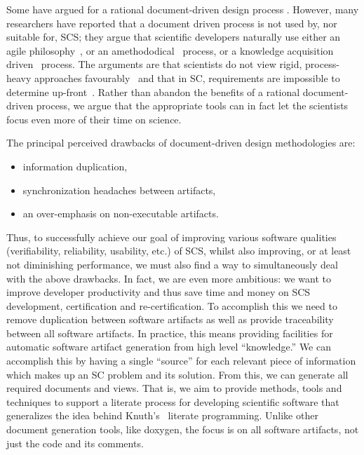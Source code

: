 \documentclass{sig-alternate-05-2015}
\begin{document}
Some have argued for a rational document-driven design process 
\cite{SmithAndKoothoor2016}.  However, many researchers have
reported that a document driven process is not used by, nor suitable for, SCS;
they argue that scientific developers naturally use either an agile
philosophy~\cite{CarverEtAl2007, EasterbrookAndJohns2009, Segal2005}, or an
amethododical~\cite{Kelly2013} process, or a knowledge acquisition
driven~\cite{Kelly2015} process.  The arguments are that scientists do not
view rigid, process-heavy approaches favourably~\cite{CarverEtAl2007} and that
in SC, requirements are impossible to determine up-front~\cite{CarverEtAl2007,
  SegalAndMorris2008}.  Rather than abandon the benefits of a rational
document-driven process, we argue that the appropriate tools can in fact
let the scientists focus even more of their time on science.

The principal perceived drawbacks of document-driven design methodologies are:
\begin{itemize}
\setlength{\itemsep}{0.0em}
\setlength{\parskip}{0pt}
\setlength{\parsep}{0pt}
\item information duplication,
\item synchronization headaches between artifacts,
\item an over-emphasis on non-executable artifacts.
\end{itemize}

Thus, to successfully achieve our goal of improving various software qualities
(verifiability, reliability, usability, etc.) of SCS, whilst also improving, or
at least not diminishing performance, we must also find a way to simultaneously
deal with the above drawbacks. In fact, we are even more ambitious: we want to
improve developer productivity and thus save time and money on SCS development,
certification and re-certification. To accomplish this we need to remove
duplication between software artifacts \cite{WilsonEtAl2013} as well as provide
traceability between all software artifacts. In practice, this means providing
facilities for automatic software artifact generation from high level
``knowledge.'' We can accomplish this by having a single ``source'' for each
relevant piece of information which makes up an SC problem and its solution.
From this, we can generate all required documents and views. That is, we aim to
provide methods, tools and techniques to support a literate process for
developing scientific software that generalizes the idea behind
Knuth's~\cite{Knuth1984} literate programming.  Unlike other document generation
tools, like doxygen, the focus is on all software artifacts, not just the code
and its comments.
\end{document}
